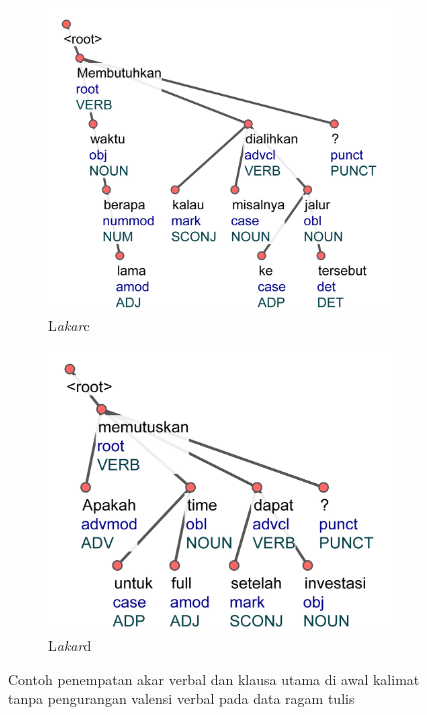 \begin{figure}
\centering

\begin{subfigure}{.49\linewidth}
  \centering
  \includegraphics[width=1\linewidth] {pics/ls4820.jpg} 
	\caption{L\textit{akar}c}
	\label{fig:ls4820} 
\end{subfigure}
%
\begin{subfigure}{.41\linewidth}
  \centering
  \includegraphics[width=1\linewidth]{pics/ls1435.jpg} 
	\caption{L\textit{akar}d}
	\label{fig:ls1435} 
\end{subfigure}
\caption{Contoh penempatan akar verbal dan klausa utama di awal kalimat tanpa pengurangan valensi verbal pada data ragam tulis}
\label{fig:rootvalensi}
\end{figure}


